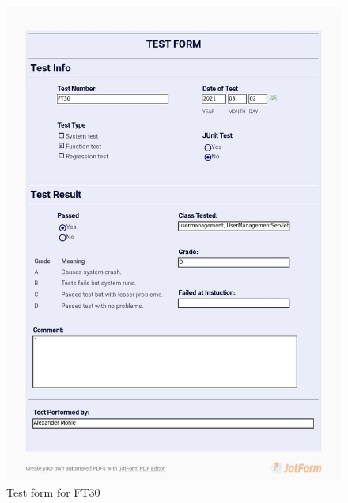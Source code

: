 \documentclass{article}
\begin{document}
 \begin{figure}
     \centering
     \includegraphics[width=13cm]{images/2021-03-02_Alexander_FT30_001}
     \renewcommand\figurename{Figure}
     \caption{Test form for FT30}
     \label{fig:my_label}
 \end{figure}
 
\end{document}
